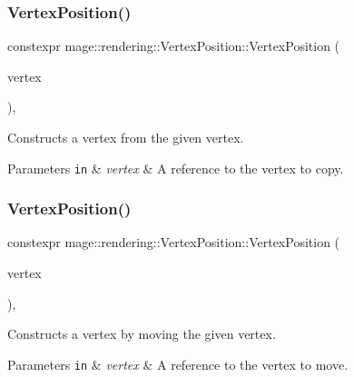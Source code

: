 \subsubsection{\texorpdfstring{Vertex\+Position()}{VertexPosition()}\hspace{0.1cm}{\footnotesize\ttfamily [3/4]}}
{\footnotesize\ttfamily constexpr mage\+::rendering\+::\+Vertex\+Position\+::\+Vertex\+Position (\begin{DoxyParamCaption}\item[{const \mbox{\hyperlink{structmage_1_1rendering_1_1_vertex_position}{Vertex\+Position}} \&}]{vertex }\end{DoxyParamCaption})\hspace{0.3cm}{\ttfamily [default]}, {\ttfamily [noexcept]}}

Constructs a vertex from the given vertex.


\begin{DoxyParams}[1]{Parameters}
\mbox{\tt in}  & {\em vertex} & A reference to the vertex to copy. \\
\hline
\end{DoxyParams}
\mbox{\label{structmage_1_1rendering_1_1_vertex_position_ad886c8131e6cf96dac4a716907b532ad}} 
\subsubsection{\texorpdfstring{Vertex\+Position()}{VertexPosition()}\hspace{0.1cm}{\footnotesize\ttfamily [4/4]}}
{\footnotesize\ttfamily constexpr mage\+::rendering\+::\+Vertex\+Position\+::\+Vertex\+Position (\begin{DoxyParamCaption}\item[{\mbox{\hyperlink{structmage_1_1rendering_1_1_vertex_position}{Vertex\+Position}} \&\&}]{vertex }\end{DoxyParamCaption})\hspace{0.3cm}{\ttfamily [default]}, {\ttfamily [noexcept]}}

Constructs a vertex by moving the given vertex.


\begin{DoxyParams}[1]{Parameters}
\mbox{\tt in}  & {\em vertex} & A reference to the vertex to move. \\
\hline
\end{DoxyParams}
\mbox{\label{structmage_1_1rendering_1_1_vertex_position_afe5c10d9422cd3b37acecd3691361057}} 
